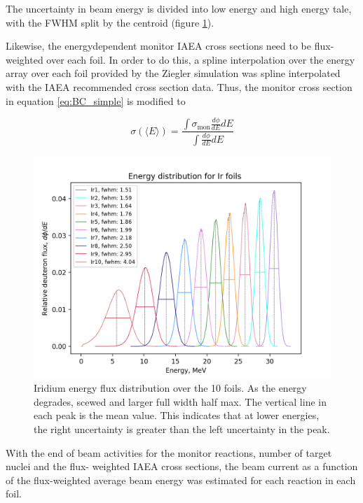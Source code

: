 \documentclass[a4paper,11pt,twoside]{book}
\begin{document}
The uncertainty in beam energy is divided into low energy and high energy tale, with the FWHM split by the centroid (figure \ref{fig:ir_energyflux}). 

Likewise, the energydependent monitor IAEA cross sections need to be flux-weighted over each foil. In order to do this, a spline interpolation over the energy array over each foil provided by the Ziegler simulation was spline interpolated with the IAEA recommended cross section data. Thus, the monitor cross section in equation \ref{eq:BC_simple} is modified to 

\begin{equation}
    \sigma (\langle E\rangle) = \frac{\int \sigma_\text{mon} \frac{d\phi}{dE}dE}{\int \frac{d\phi}{dE}dE}
\end{equation}


\begin{figure}
    \centering
    \includegraphics{Analysis/Ir_flux_distribution_B_+2_D_+4,25.png}
    \caption{Iridium energy flux distribution over the 10 foils. As the energy degrades, scewed and larger full width half max. The vertical line in each peak is the mean value. This indicates that at lower energies, the right uncertainty is greater than the left uncertainty in the peak.}
    \label{fig:ir_energyflux}
\end{figure}

With the end of beam activities for the monitor reactions, number of target nuclei and the flux- weighted IAEA cross sections, the beam current as a function of the flux-weighted average beam energy was estimated for each reaction in each foil. 
\end{document}
